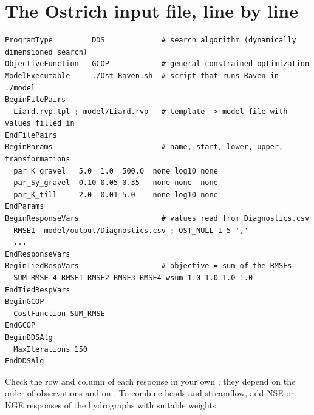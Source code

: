 \section{The Ostrich input file, line by line}
\begin{lstlisting}
ProgramType         DDS             # search algorithm (dynamically dimensioned search)
ObjectiveFunction   GCOP            # general constrained optimization
ModelExecutable     ./Ost-Raven.sh  # script that runs Raven in ./model
BeginFilePairs
  Liard.rvp.tpl ; model/Liard.rvp   # template -> model file with values filled in
EndFilePairs
BeginParams                         # name, start, lower, upper, transformations
  par_K_gravel   5.0  1.0  500.0  none log10 none
  par_Sy_gravel  0.10 0.05 0.35   none none  none
  par_K_till     2.0  0.01 5.0    none log10 none
EndParams
BeginResponseVars                   # values read from Diagnostics.csv
  RMSE1  model/output/Diagnostics.csv ; OST_NULL 1 5 ','
  ...
EndResponseVars
BeginTiedRespVars                   # objective = sum of the RMSEs
  SUM_RMSE 4 RMSE1 RMSE2 RMSE3 RMSE4 wsum 1.0 1.0 1.0 1.0
EndTiedRespVars
BeginGCOP
  CostFunction SUM_RMSE
EndGCOP
BeginDDSAlg
  MaxIterations 150
EndDDSAlg
\end{lstlisting}
Check the row and column of each response in your own ; they depend on the order of observations and on
. To combine heads and streamflow, add NSE or KGE responses of the hydrographs with suitable weights.

